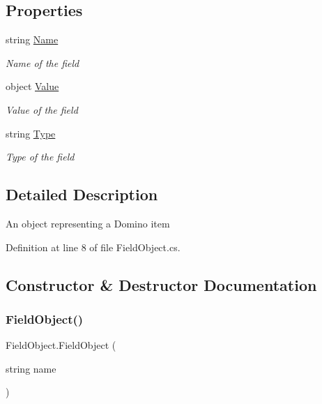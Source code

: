 \subsection*{Properties}
\begin{DoxyCompactItemize}
\item 
string \hyperlink{class_field_object_ae5d972e96a3eca93407da8e8a89abfd1}{Name}
\begin{DoxyCompactList}\small\item\em Name of the field \end{DoxyCompactList}\item 
object \hyperlink{class_field_object_a9764fb1824cec95b82cd6ac0b4cd8919}{Value}
\begin{DoxyCompactList}\small\item\em Value of the field \end{DoxyCompactList}\item 
string \hyperlink{class_field_object_a370af2c26ae9c3e713b5d88b62a2a8f9}{Type}
\begin{DoxyCompactList}\small\item\em Type of the field \end{DoxyCompactList}\end{DoxyCompactItemize}


\subsection{Detailed Description}
An object representing a Domino item 



Definition at line 8 of file Field\+Object.\+cs.



\subsection{Constructor \& Destructor Documentation}
\mbox{\label{class_field_object_a87d8d3f1a36d94dec64e8e467950074b}} 
\subsubsection{\texorpdfstring{Field\+Object()}{FieldObject()}}
{\footnotesize\ttfamily Field\+Object.\+Field\+Object (\begin{DoxyParamCaption}\item[{string}]{name }\end{DoxyParamCaption})}



